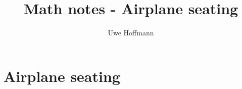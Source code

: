 

\title{Math notes - Airplane seating}
\author{Uwe Hoffmann}



\setcounter{chapter}{1}
\chapter*{Airplane seating}

